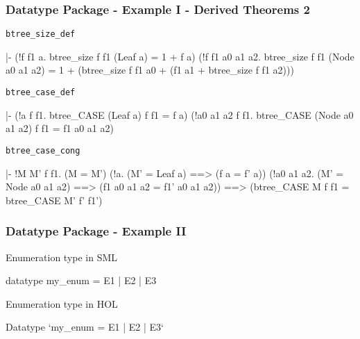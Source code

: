 \begin{frame}[fragile]
\frametitle{Datatype Package - Example I - Derived Theorems 2}

\begin{block}{\texttt{btree\_size\_def}}
\begin{semiverbatim}\scriptsize
|- (!f f1 a. btree_size f f1 (Leaf a) = 1 + f a) \holAnd{}
   (!f f1 a0 a1 a2.
     btree_size f f1 (Node a0 a1 a2) =
     1 + (btree_size f f1 a0 + (f1 a1 + btree_size f f1 a2)))
\end{semiverbatim}
\end{block}

\begin{block}{\texttt{btree\_case\_def}}
\begin{semiverbatim}\scriptsize
|- (!a f f1. btree_CASE (Leaf a) f f1 = f a) \holAnd{}
   (!a0 a1 a2 f f1. btree_CASE (Node a0 a1 a2) f f1 = f1 a0 a1 a2)
\end{semiverbatim}
\end{block}

\begin{block}{\texttt{btree\_case\_cong}}
\begin{semiverbatim}\scriptsize
|- !M M' f f1.
     (M = M') \holAnd{} (!a. (M' = Leaf a) ==> (f a = f' a)) \holAnd{}
     (!a0 a1 a2.
        (M' = Node a0 a1 a2) ==> (f1 a0 a1 a2 = f1' a0 a1 a2)) ==>
     (btree_CASE M f f1 = btree_CASE M' f' f1')
\end{semiverbatim}
\end{block}

\end{frame}


\begin{frame}[fragile]
\frametitle{Datatype Package - Example II}
\begin{block}{Enumeration type in SML}
\begin{semiverbatim}\scriptsize
datatype my_enum = E1 | E2 | E3
\end{semiverbatim}
\end{block}

\begin{block}{Enumeration type in HOL}
\begin{semiverbatim}\scriptsize
Datatype `my_enum = E1 | E2 | E3`
\end{semiverbatim}
\end{block}
\end{frame}


